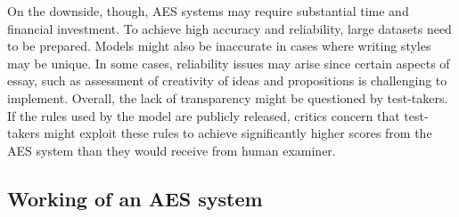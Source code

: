\documentclass{article}
\begin{document}
On the downside, though, AES systems may require substantial time and financial investment. To achieve high accuracy and reliability, large datasets need to be prepared. Models might also be inaccurate in cases where writing styles may be unique. In some cases, reliability issues may arise since certain aspects of essay, such as assessment of creativity of ideas and propositions is challenging to implement. Overall, the lack of transparency might be questioned by test-takers. If the rules used by the model are publicly released, critics concern that test-takers might exploit these rules to achieve significantly higher scores from the AES system than they would receive from human examiner. \\ 
\subsection{Working of an AES system}
\begin{center}
\end{center}
\end{document}
